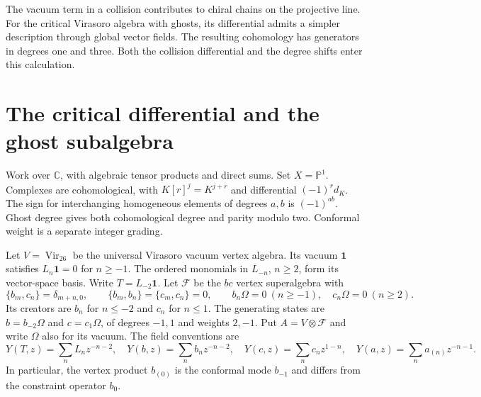 The vacuum term in a collision contributes to chiral chains on the projective line.
For the critical Virasoro algebra with ghosts, its differential admits a simpler description through global vector fields.
The resulting cohomology has generators in degrees one and three.
Both the collision differential and the degree shifts enter this calculation.

\section{The critical differential and the ghost subalgebra}

Work over $\mathbb C$, with algebraic tensor products and direct sums.
Set $X=\mathbb P^1$.
Complexes are cohomological, with $K[r]^j=K^{j+r}$ and differential $(-1)^r d_K$.
The sign for interchanging homogeneous elements of degrees $a,b$ is $(-1)^{ab}$.
Ghost degree gives both cohomological degree and parity modulo two.
Conformal weight is a separate integer grading.

Let $V=\operatorname{Vir}_{26}$ be the universal Virasoro vacuum vertex algebra.
Its vacuum $\mathbf1$ satisfies $L_n\mathbf1=0$ for $n\geq-1$.
The ordered monomials in $L_{-n}$, $n\geq2$, form its vector-space basis.
Write $T=L_{-2}\mathbf1$.
Let $\mathcal F$ be the $bc$ vertex superalgebra with
\[
 \{b_m,c_n\}=\delta_{m+n,0},\qquad
 \{b_m,b_n\}=\{c_m,c_n\}=0,
 \qquad
 b_n\Omega=0\ (n\geq-1),\quad c_n\Omega=0\ (n\geq2).
\]
Its creators are $b_n$ for $n\leq-2$ and $c_n$ for $n\leq1$.
The generating states are $b=b_{-2}\Omega$ and $c=c_1\Omega$, of degrees $-1,1$ and weights $2,-1$.
Put $A=V\otimes\mathcal F$ and write $\Omega$ also for its vacuum.
The field conventions are
\[
 Y(T,z)=\sum_nL_nz^{-n-2},\quad
 Y(b,z)=\sum_nb_nz^{-n-2},\quad
 Y(c,z)=\sum_nc_nz^{1-n},\quad
 Y(a,z)=\sum_na_{(n)}z^{-n-1}.
\]
In particular, the vertex product $b_{(0)}$ is the conformal mode $b_{-1}$ and differs from the constraint operator $b_0$.

